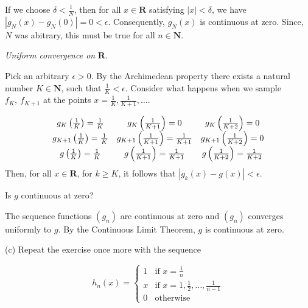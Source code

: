 \documentclass[10pt]{article}
\begin{document}
If we choose $\displaystyle \delta < \frac{1}{N}$, then for all $\displaystyle x\in \mathbf{R}$ satisfying $\displaystyle |x|< \delta $, we have $\displaystyle |g_{N}( x) -g_{N}( 0) |=0< \epsilon $. Consequently, $\displaystyle g_{N}( x)$ is continuous at zero. Since, $\displaystyle N$ was abitrary, this must be true for all $\displaystyle n\in \mathbf{N}$.



\textit{Uniform convergence on }$\displaystyle \mathbf{R}$. 



Pick an arbitrary $\displaystyle \epsilon  >0$. By the Archimedean property there exists a natural number $\displaystyle K\in \mathbf{N}$, such that $\displaystyle \frac{1}{K} < \epsilon $. Consider what happens when we sample $\displaystyle f_{K} ,\ f_{K+1}$ at the points $\displaystyle x=\frac{1}{K} ,\frac{1}{K+1} ,\dotsc $.


\begin{equation*}
\begin{array}{ c c c }
g_{K}\left(\frac{1}{K}\right) =\frac{1}{K} & g_{K}\left(\frac{1}{K+1}\right) =0 & g_{K}\left(\frac{1}{K+2}\right) =0\\
g_{K+1}\left(\frac{1}{K}\right) =\frac{1}{K} & g_{K+1}\left(\frac{1}{K+1}\right) =\frac{1}{K+1} & g_{K+1}\left(\frac{1}{K+2}\right) =0\\
g\left(\frac{1}{K}\right) =\frac{1}{K} & g\left(\frac{1}{K+1}\right) =\frac{1}{K+1} & g\left(\frac{1}{K+2}\right) =\frac{1}{K+2}
\end{array}
\end{equation*}
Then, for all $\displaystyle x\in \mathbf{R}$, for $\displaystyle k\geq K$, it follows that $\displaystyle |g_{k}( x) -g( x) |< \epsilon $. 



Is $\displaystyle g$ continuous at zero?



The sequence functions $\displaystyle ( g_{n})$ are continuous at zero and $\displaystyle ( g_{n})$ converges uniformly to $\displaystyle g$. By the Continuous Limit Theorem, $\displaystyle g$ is continuous at zero.



(c) Repeat the exercise once more with the sequence 


\begin{equation*}
h_{n}( x) =\begin{cases}
1 & \text{if } x=\frac{1}{n}\\
x & \text{if } x=1,\frac{1}{2} ,\dotsc ,\frac{1}{n-1}\\
0 & \text{otherwise}
\end{cases}
\end{equation*}
\end{document}
